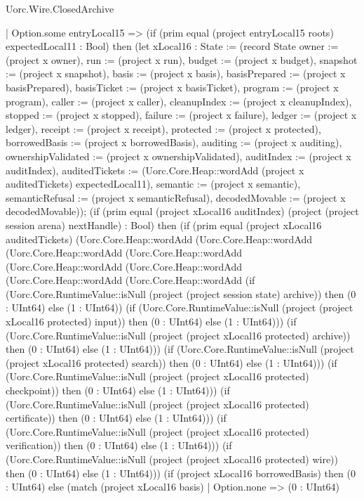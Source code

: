 \begin{lexlean}{Uorc.Wire.ClosedArchive}
\begin{semanticmodule}
{    | Option.some entryLocal15 => (if (prim equal (project entryLocal15 roots) expectedLocal11 : Bool) then (let xLocal16 : State := (record State {owner := (project x owner), run := (project x run), budget := (project x budget), snapshot := (project x snapshot), basis := (project x basis), basisPrepared := (project x basisPrepared), basisTicket := (project x basisTicket), program := (project x program), caller := (project x caller), cleanupIndex := (project x cleanupIndex), stopped := (project x stopped), failure := (project x failure), ledger := (project x ledger), receipt := (project x receipt), protected := (project x protected), borrowedBasis := (project x borrowedBasis), auditing := (project x auditing), ownershipValidated := (project x ownershipValidated), auditIndex := (project x auditIndex), auditedTickets := (Uorc.Core.Heap::wordAdd (project x auditedTickets) expectedLocal11), semantic := (project x semantic), semanticRefusal := (project x semanticRefusal), decodedMovable := (project x decodedMovable)}); (if (prim equal (project xLocal16 auditIndex) (project (project session arena) nextHandle) : Bool) then (if (prim equal (project xLocal16 auditedTickets) (Uorc.Core.Heap::wordAdd (Uorc.Core.Heap::wordAdd (Uorc.Core.Heap::wordAdd (Uorc.Core.Heap::wordAdd (Uorc.Core.Heap::wordAdd (Uorc.Core.Heap::wordAdd (Uorc.Core.Heap::wordAdd (Uorc.Core.Heap::wordAdd (if (Uorc.Core.RuntimeValue::isNull (project (project session state) archive)) then (0 : UInt64) else (1 : UInt64)) (if (Uorc.Core.RuntimeValue::isNull (project (project xLocal16 protected) input)) then (0 : UInt64) else (1 : UInt64))) (if (Uorc.Core.RuntimeValue::isNull (project (project xLocal16 protected) archive)) then (0 : UInt64) else (1 : UInt64))) (if (Uorc.Core.RuntimeValue::isNull (project (project xLocal16 protected) search)) then (0 : UInt64) else (1 : UInt64))) (if (Uorc.Core.RuntimeValue::isNull (project (project xLocal16 protected) checkpoint)) then (0 : UInt64) else (1 : UInt64))) (if (Uorc.Core.RuntimeValue::isNull (project (project xLocal16 protected) certificate)) then (0 : UInt64) else (1 : UInt64))) (if (Uorc.Core.RuntimeValue::isNull (project (project xLocal16 protected) verification)) then (0 : UInt64) else (1 : UInt64))) (if (Uorc.Core.RuntimeValue::isNull (project (project xLocal16 protected) wire)) then (0 : UInt64) else (1 : UInt64))) (if (project xLocal16 borrowedBasis) then (0 : UInt64) else (match (project xLocal16 basis)
      | Option.none => (0 : UInt64)
}
\end{semanticmodule}
\end{lexlean}
